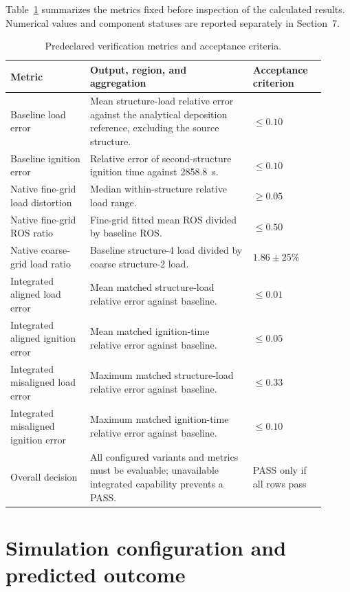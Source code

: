 Table~\ref{tab:acceptance-contract} summarizes the metrics fixed before
inspection of the calculated results. Numerical values and component statuses
are reported separately in Section~7.

\begin{table}[H]
\centering
\footnotesize
\caption{Predeclared verification metrics and acceptance criteria.}
\label{tab:acceptance-contract}
\begin{tabular}{@{}p{0.23\linewidth}p{0.47\linewidth}p{0.21\linewidth}@{}}
\toprule
Metric & Output, region, and aggregation & Acceptance criterion\\
\midrule
Baseline load error & Mean structure-load relative error against the analytical deposition reference, excluding the source structure. & \(\le0.10\) \\
Baseline ignition error & Relative error of second-structure ignition time against \SI{2858.8}{s}. & \(\le0.10\) \\
Native fine-grid load distortion & Median within-structure relative load range. & \(\ge0.05\) \\
Native fine-grid ROS ratio & Fine-grid fitted mean ROS divided by baseline ROS. & \(\le0.50\) \\
Native coarse-grid load ratio & Baseline structure-4 load divided by coarse structure-2 load. & \(1.86\pm25\%\) \\
Integrated aligned load error & Mean matched structure-load relative error against baseline. & \(\le0.01\) \\
Integrated aligned ignition error & Mean matched ignition-time relative error against baseline. & \(\le0.05\) \\
Integrated misaligned load error & Maximum matched structure-load relative error against baseline. & \(\le0.33\) \\
Integrated misaligned ignition error & Maximum matched ignition-time relative error against baseline. & \(\le0.10\) \\
Overall decision & All configured variants and metrics must be evaluable; unavailable integrated capability prevents a PASS. & PASS only if all rows pass \\
\bottomrule
\end{tabular}
\end{table}

\section{Simulation configuration and predicted outcome}

